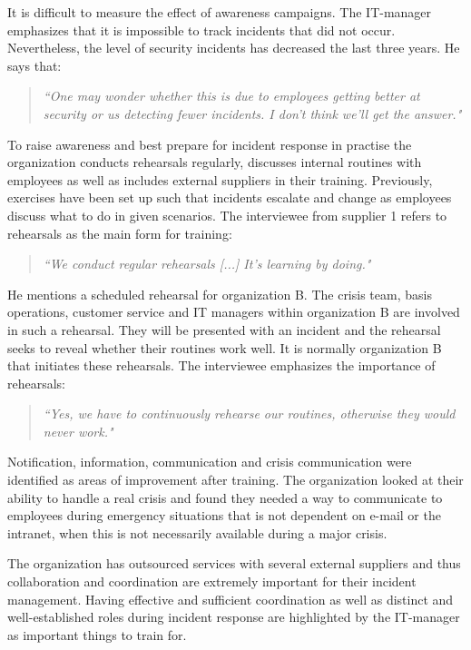It is difficult to measure the effect of awareness campaigns. The IT-manager emphasizes that it is impossible to track incidents that did not occur. Nevertheless, the level of security incidents has decreased the last three years. He says that:
\begin{quote}
\textit{``One may wonder whether this is due to employees getting better at security or us detecting fewer incidents. I don't think we'll get the answer."}
\end{quote}
 
To raise awareness and best prepare for incident response in practise the organization conducts rehearsals regularly, discusses internal routines with employees as well as includes external suppliers in their training. Previously, exercises have been set up such that incidents escalate and change as employees discuss what to do in given scenarios. The interviewee from supplier 1 refers to rehearsals as the main form for training:

\begin{quote}
\textit{``We conduct regular rehearsals [...] It's learning by doing."}
\end{quote}

He mentions a scheduled rehearsal for organization B. The crisis team, basis operations, customer service and IT managers within organization B are involved in such a rehearsal. They will be presented with an incident and the rehearsal seeks to reveal whether their routines work well. It is normally organization B that initiates these rehearsals. The interviewee emphasizes the importance of rehearsals:

\begin{quote}
\textit{``Yes, we have to continuously rehearse our routines, otherwise they would never work."}
\end{quote}

Notification, information, communication and crisis communication were identified as areas of improvement after training. The organization looked at their ability to handle a real crisis and found they needed a way to communicate to employees during emergency situations that is not dependent on e-mail or the intranet, when this is not necessarily available during a major crisis.

The organization has outsourced services with several external suppliers and thus collaboration and coordination are extremely important for their incident management. Having effective and sufficient coordination as well as distinct and well-established roles during incident response are highlighted by the IT-manager as important things to train for.

